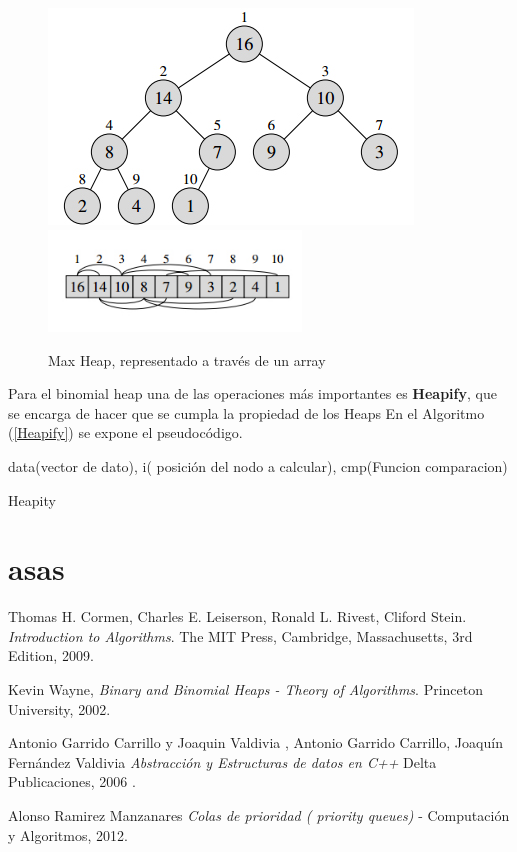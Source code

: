 \documentclass[a4paper,10pt]{article}
\begin{document}
\begin{figure}[!ht]
	\caption{Max Heap, representado a través de un array}
	\label{fig:heapMax} 
	\begin{center}
	  \includegraphics[scale=0.6]{heap_maximo.jpg}	
	 \includegraphics[width=0.6\textwidth]{heap_array.jpg}
	\end{center}	
\end{figure}


Para el binomial heap una de las operaciones más importantes es \textbf{Heapify}, que
se encarga de hacer que se cumpla la propiedad de los Heaps En el Algoritmo (\ref{Heapify}) se expone el pseudocódigo.


\begin{algorithm}[1]

	\REQUIRE data(vector de dato), i( posición del nodo a calcular), cmp(Funcion comparacion)
	\caption{Heapity} \label{alg:algoritmoHeapify}
\end{algorithm}






\section{asas}




\newpage
	\begin{thebibliography}{9}

Thomas H. Cormen, Charles E. Leiserson, Ronald L. Rivest, Cliford Stein.
\textit{Introduction to Algorithms}. The MIT Press, Cambridge, Massachusetts, 3rd
Edition, 2009.

Kevin Wayne,\textit{ Binary and Binomial Heaps - Theory of Algorithms}. Princeton
University, 2002.

Antonio Garrido Carrillo y Joaquin Valdivia , Antonio Garrido Carrillo, Joaquín Fernández Valdivia
\textit{Abstracción y Estructuras de datos en C++}
Delta Publicaciones, 2006 .

Alonso Ramirez Manzanares \textit{Colas de prioridad ( priority queues)} - Computación y Algoritmos, 2012.   
  
  
	\end{thebibliography}
	
	
	
\end{document}
